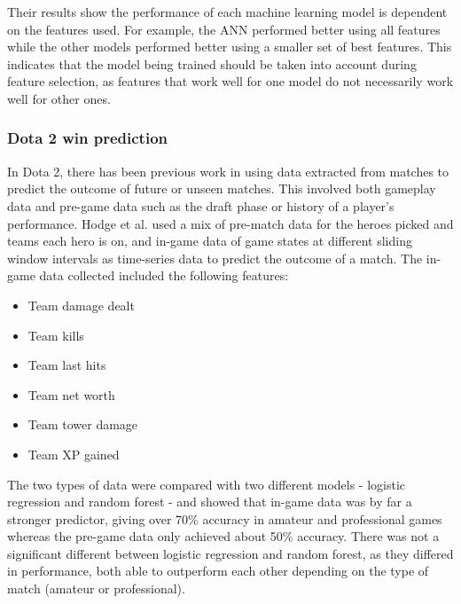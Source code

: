 \documentclass[Report.tex]{subfiles}
\begin{document}
Their results show the performance of each machine learning model is dependent on the features used. For example, the ANN performed better using all features while the other models performed better using a smaller set of best features. This indicates that the model being trained should be taken into account during feature selection, as features that work well for one model do not necessarily work well for other ones. 

\subsubsection{Dota 2 win prediction}
In Dota 2, there has been previous work in using data extracted from matches to predict the outcome of future or unseen matches. This involved both gameplay data and pre-game data such as the draft phase or history of a player's performance. Hodge et al. \cite{dota-mixed-rank-win} used a mix of pre-match data for the heroes picked and teams each hero is on, and in-game data of game states at different sliding window intervals as time-series data to predict the outcome of a match. The in-game data collected included the following features:
\begin{itemize}
\item Team damage dealt
\item Team kills
\item Team last hits
\item Team net worth
\item Team tower damage
\item Team XP gained
\end{itemize}
The two types of data were compared with two different models - logistic regression and random forest - and showed that in-game data was by far a stronger predictor, giving over 70\% accuracy in amateur and professional games whereas the pre-game data only achieved about 50\% accuracy. There was not a significant different between logistic regression and random forest, as they differed in performance, both able to outperform each other depending on the type of match (amateur or professional). 
\end{document}
